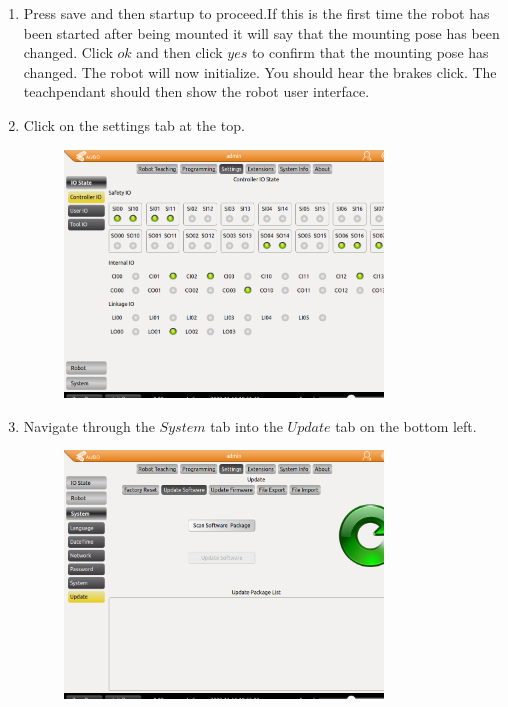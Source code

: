 \documentclass{article}
\begin{document}
\begin{enumerate}
\begin{figure}[H]
\end{figure}
\item Press save and then startup to proceed.If this is the first time the robot has been started after being mounted it will say that the mounting pose has been changed. Click $ok$ and then click $yes$ to confirm that the mounting pose has changed. The robot will now initialize. You should hear the brakes click.  The teachpendant should then show the robot user interface.   
\item Click on the settings tab at the top. 
\begin{figure}[H]\centering
  \includegraphics[width=0.8\textwidth]{../../Images/settings.png}
\end{figure}
\item Navigate through the $System$ tab into the $Update$ tab on the bottom left. 
\begin{figure}[H]\centering
  \includegraphics[width=0.8\textwidth]{../../Images/update.png}
\end{figure}

\end{enumerate}
\end{document}
